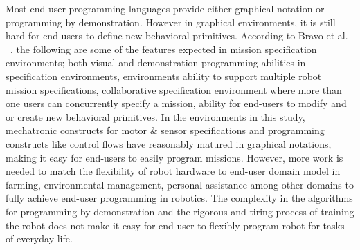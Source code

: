 Most end-user programming languages provide either graphical notation or programming by demonstration. However in graphical environments, it is still hard for end-users to define new behavioral primitives.%
 According to Bravo et al. ~\cite{Bravo2018}, the following are some of the features expected in mission specification environments; both visual and demonstration programming abilities in specification environments, environments ability to support multiple robot mission specifications, collaborative specification environment where more than one users can concurrently specify a mission, ability for end-users to modify and or create new behavioral primitives. 
 In the environments in this study, mechatronic constructs for motor \& sensor specifications and programming constructs like control flows have reasonably matured in graphical notations, making it easy for end-users to easily program missions. However, more work is needed to match the flexibility of robot hardware to end-user domain model in farming, environmental management, personal assistance among other domains to fully achieve end-user programming in robotics. The complexity in the algorithms for programming by demonstration and the rigorous and tiring process of training the robot does not make it easy for end-user to flexibly program robot for tasks of everyday life.

